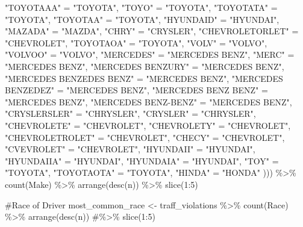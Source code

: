 \documentclass[
  letterpaper,
  DIV=11,
  numbers=noendperiod]{scrartcl}
\newenvironment{Shaded}{\begin{snugshade}}{\end{snugshade}}
\newcommand{\CommentTok}[1]{\textcolor[rgb]{0.37,0.37,0.37}{#1}}
\newcommand{\DecValTok}[1]{\textcolor[rgb]{0.68,0.00,0.00}{#1}}
\newcommand{\FunctionTok}[1]{\textcolor[rgb]{0.28,0.35,0.67}{#1}}
\newcommand{\NormalTok}[1]{\textcolor[rgb]{0.00,0.23,0.31}{#1}}
\newcommand{\OtherTok}[1]{\textcolor[rgb]{0.00,0.23,0.31}{#1}}
\newcommand{\SpecialCharTok}[1]{\textcolor[rgb]{0.37,0.37,0.37}{#1}}
\newcommand{\StringTok}[1]{\textcolor[rgb]{0.13,0.47,0.30}{#1}}
\begin{document}
\begin{Shaded}
\begin{Highlighting}[]
    \StringTok{"TOYOTAAA"} \OtherTok{=} \StringTok{"TOYOTA"}\NormalTok{,}
    \StringTok{"TOYO"} \OtherTok{=} \StringTok{"TOYOTA"}\NormalTok{,}
    \StringTok{"TOYOTATA"} \OtherTok{=} \StringTok{"TOYOTA"}\NormalTok{,}
    \StringTok{"TOYOTAA"} \OtherTok{=} \StringTok{"TOYOTA"}\NormalTok{,}
    \StringTok{"HYUNDAID"} \OtherTok{=} \StringTok{"HYUNDAI"}\NormalTok{,}
    \StringTok{"MAZADA"} \OtherTok{=} \StringTok{"MAZDA"}\NormalTok{,}
    \StringTok{"CHRY"} \OtherTok{=} \StringTok{"CRYSLER"}\NormalTok{,}
    \StringTok{"CHEVROLETORLET"} \OtherTok{=} \StringTok{"CHEVROLET"}\NormalTok{,}
    \StringTok{"TOYOTAOA"} \OtherTok{=} \StringTok{"TOYOTA"}\NormalTok{,}
    \StringTok{"VOLV"} \OtherTok{=} \StringTok{"VOLVO"}\NormalTok{,}
    \StringTok{"VOLVOO"} \OtherTok{=} \StringTok{"VOLVO"}\NormalTok{,}
    \StringTok{"MERCEDES"} \OtherTok{=} \StringTok{"MERCEDES BENZ"}\NormalTok{,}
    \StringTok{"MERC"} \OtherTok{=} \StringTok{"MERCEDES BENZ"}\NormalTok{,}
    \StringTok{"MERCEDES BENZURY"} \OtherTok{=} \StringTok{"MERCEDES BENZ"}\NormalTok{,}
    \StringTok{"MERCEDES BENZEDES BENZ"} \OtherTok{=} \StringTok{"MERCEDES BENZ"}\NormalTok{,}
    \StringTok{"MERCEDES BENZEDEZ"} \OtherTok{=} \StringTok{"MERCEDES BENZ"}\NormalTok{,}
    \StringTok{"MERCEDES BENZ BENZ"} \OtherTok{=} \StringTok{"MERCEDES BENZ"}\NormalTok{,}
    \StringTok{"MERCEDES BENZ{-}BENZ"} \OtherTok{=} \StringTok{"MERCEDES BENZ"}\NormalTok{,}
    \StringTok{"CRYSLERSLER"} \OtherTok{=} \StringTok{"CHRYSLER"}\NormalTok{,}
    \StringTok{"CRYSLER"} \OtherTok{=} \StringTok{"CHRYSLER"}\NormalTok{,}
    \StringTok{"CHEVROLETE"} \OtherTok{=} \StringTok{"CHEVROLET"}\NormalTok{,}
    \StringTok{"CHEVROLETY"} \OtherTok{=} \StringTok{"CHEVROLET"}\NormalTok{,}
    \StringTok{"CHEVROLETROLET"} \OtherTok{=} \StringTok{"CHEVROLET"}\NormalTok{,}
    \StringTok{"CHECY"} \OtherTok{=} \StringTok{"CHEVROLET"}\NormalTok{,}
    \StringTok{"CVEVROLET"} \OtherTok{=} \StringTok{"CHEVROLET"}\NormalTok{,}
    \StringTok{"HYUNDAII"} \OtherTok{=} \StringTok{"HYUNDAI"}\NormalTok{,}
    \StringTok{"HYUNDAIIA"} \OtherTok{=} \StringTok{"HYUNDAI"}\NormalTok{,}
    \StringTok{"HYUNDAIA"} \OtherTok{=} \StringTok{"HYUNDAI"}\NormalTok{,}
    \StringTok{"TOY"} \OtherTok{=} \StringTok{"TOYOTA"}\NormalTok{,}
    \StringTok{"TOYOTAOTA"} \OtherTok{=} \StringTok{"TOYOTA"}\NormalTok{,}
    \StringTok{"HINDA"} \OtherTok{=} \StringTok{"HONDA"}
\NormalTok{  ))) }\SpecialCharTok{\%\textgreater{}\%}
  \FunctionTok{count}\NormalTok{(Make) }\SpecialCharTok{\%\textgreater{}\%}
  \FunctionTok{arrange}\NormalTok{(}\FunctionTok{desc}\NormalTok{(n)) }\SpecialCharTok{\%\textgreater{}\%}
  \FunctionTok{slice}\NormalTok{(}\DecValTok{1}\SpecialCharTok{:}\DecValTok{5}\NormalTok{)}


\CommentTok{\#Race of Driver}
\NormalTok{most\_common\_race }\OtherTok{\textless{}{-}}\NormalTok{ traff\_violations }\SpecialCharTok{\%\textgreater{}\%}
  \FunctionTok{count}\NormalTok{(Race) }\SpecialCharTok{\%\textgreater{}\%}
  \FunctionTok{arrange}\NormalTok{(}\FunctionTok{desc}\NormalTok{(n)) }
  \CommentTok{\#\%\textgreater{}\% slice(1:5)}
\end{Highlighting}
\end{Shaded}
\end{document}
